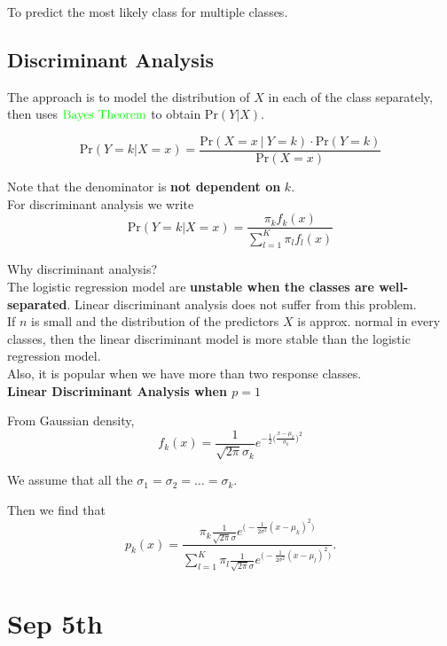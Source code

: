 \documentclass{article}
\begin{document}
To predict the most likely class for multiple classes.

\subsection{Discriminant Analysis}

The approach is to model the distribution of $X$ in each of the class separately, then uses $\color{green}{\mathrm{Bayes \ Theorem}}$ to obtain $\mathrm{Pr}(Y \vert X)$.

$$\mathrm{Pr}(Y = k \vert X = x) = \frac{\mathrm{Pr}(X = x \ \vert\ Y = k) \cdot \mathrm{Pr}(Y = k)}{\mathrm{Pr}(X = x)}$$

Note that the denominator is \textbf{not dependent on} $k$.\\

For discriminant analysis we write 
$$\mathrm{Pr}(Y = k \vert X = x) = \frac{\pi_k f_k(x)}{\sum_{l=1}^K \pi_l f_l(x)}$$

Why discriminant analysis?\\

The logistic regression model are \textbf{unstable when the classes are well-separated}. Linear discriminant analysis does not suffer from this problem.\\

If $n$ is small and the distribution of the predictors $X$ is approx. normal in every classes, then the linear discriminant model is more stable than the logistic regression model.\\

Also, it is popular when we have more than two response classes.\\

\textbf{Linear Discriminant Analysis when $p = 1$}

From Gaussian density, $$f_k(x) = \frac{1}{\sqrt{2\pi}\sigma_k}e^{-\frac{1}{2}\Big(\frac{x - \mu_k}{\sigma_k}\Big)^2}$$

We assume that all the $\sigma_1 = \sigma_2 = \dots = \sigma_k$.

Then we find that $$p_k(x) = \frac{\pi_k \frac{1}{\sqrt{2\pi}\sigma}e^{\Big(- \frac{1}{2\sigma^2}(x - \mu_k)^2\Big)}}{\sum_{l=1}^K \pi_l \frac{1}{\sqrt{2\pi}\sigma}e^{\Big(- \frac{1}{2\sigma^2}(x - \mu_l)^2\Big)}}.$$

\section{Sep 5th}
\end{document}
